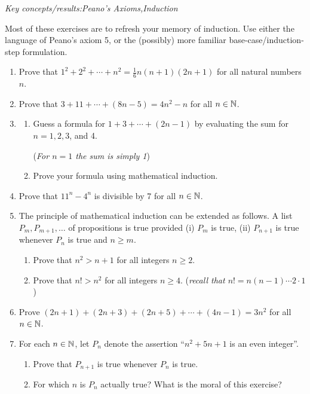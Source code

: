 \begin{exercises}{}{}
	\emph{Key concepts/results:\quad Peano's Axioms,\quad Induction}\smallbreak
	
	Most of these exercises are to refresh your memory of induction. Use either the language of Peano's axiom 5, or the (possibly) more familiar base-case/induction-step formulation.	
	\begin{enumerate}
	  \item%
	  Prove that $1^2+2^2+\cdots+n^2=\frac 16n(n+1)(2n+1)$ for all natural numbers $n$.
	  
	  
	  \item%
	  Prove that $3+11+\cdots+(8n-5)=4n^2-n$ for all $n\in\mathbb{N}$.
	
	
	  \item%
	  \begin{enumerate}
	  	\item Guess a formula for $1+3+\cdots+(2n-1)$ by evaluating the sum for $n=1,2,3$, and 4.\par
	  	(\emph{For $n=1$ the sum is simply 1})
	  
	  	\item Prove your formula using mathematical induction.
	  \end{enumerate}
	  
	  
	  \item%
	  Prove that $11^n-4^n$ is divisible by 7 for all $n\in\mathbb{N}$.
	  
	  
	  \item%
	  The principle of mathematical induction can be extended as follows. A list $P_m,P_{m+1},\ldots$ of propositions is true provided (i) $P_m$ is true, (ii) $P_{n+1}$ is true whenever $P_n$ is true and $n\ge m$.
	  \begin{enumerate}
	  	\item Prove that $n^2>n+1$ for all integers $n\ge 2$.
	  	\item Prove that $n!>n^2$ for all integers $n\ge 4$.\hfill
	  	(\emph{recall that $n!=n(n-1)\cdots 2\cdot 1$})
	  \end{enumerate}
	  
	  
	  \item%
	  Prove $(2n+1)+(2n+3)+(2n+5)+\cdots+(4n-1)=3n^2$ for all $n\in\mathbb{N}$.
	  
	  
	  \item%
	  For each $n\in\mathbb{N}$, let $P_n$ denote the assertion ``$n^2+5n+1$ is an even integer''.
	  \begin{enumerate}
	  	\item Prove that $P_{n+1}$ is true whenever $P_n$ is true.
	  	\item For which $n$ is $P_n$ actually true? What is the moral of this exercise?
	  \end{enumerate}
	  

\end{enumerate}
\end{exercises}
